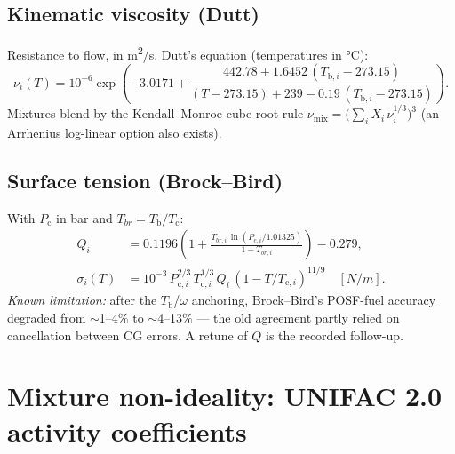 \documentclass[11pt]{article}
\newcommand{\Tb}{T_{\mathrm{b}}}
\newcommand{\Tc}{T_{\mathrm{c}}}
\newcommand{\Pc}{P_{\mathrm{c}}}
\begin{document}
\subsection{Kinematic viscosity (Dutt)}
Resistance to flow, in \si{m^2/s}. Dutt's equation (temperatures in
\si{\celsius}):
\begin{equation}
  \nu_i(T) = 10^{-6}
  \exp\!\left( -3.0171 +
  \frac{442.78 + 1.6452\,(T_{\mathrm{b},i} - 273.15)}
       {(T - 273.15) + 239 - 0.19\,(T_{\mathrm{b},i}-273.15)} \right).
\end{equation}
Mixtures blend by the Kendall--Monroe cube-root rule
$\nu_{\mathrm{mix}} = \big(\sum_i X_i\, \nu_i^{1/3}\big)^3$ (an
Arrhenius log-linear option also exists).

\subsection{Surface tension (Brock--Bird)}
With $\Pc$ in bar and $T_{br}=\Tb/\Tc$:
\begin{align}
  Q_i &= 0.1196\left(1 +
        \frac{T_{br,i}\, \ln(P_{\mathrm{c},i}/1.01325)}{1 - T_{br,i}}\right) - 0.279,\\
  \sigma_i(T) &= 10^{-3}\, P_{\mathrm{c},i}^{2/3}\, T_{\mathrm{c},i}^{1/3}\, Q_i\,
                (1 - T/T_{\mathrm{c},i})^{11/9} \quad [\si{N/m}].
\end{align}
\emph{Known limitation:} after the $\Tb$/$\omega$ anchoring, Brock--Bird's
POSF-fuel accuracy degraded from $\sim$1--4\% to $\sim$4--13\% --- the old
agreement partly relied on cancellation between CG errors. A retune of $Q$
is the recorded follow-up.

\section{Mixture non-ideality: UNIFAC 2.0 activity coefficients}
\end{document}
